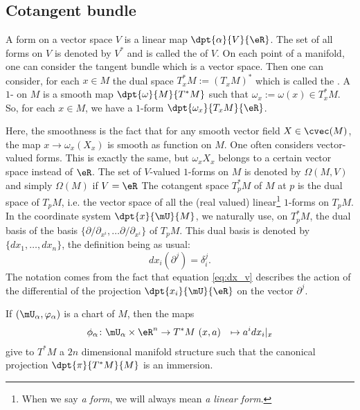 \subsection{Cotangent bundle}

A form on a vector space $V$ is a linear map $\dpt{\alpha}{V}{\eR}$. The set of all forms on $V$ is denoted by $V^*$ and is called the  of $V$. On each point of a manifold, one can consider the tangent bundle which is a vector space. Then one can consider, for each $x\in M$ the dual space $T^*_xM:=(T_xM)^*$ which is called the . A $1$- on $M$ is a smooth map $\dpt{\omega}{M}{T^*M}$ such that $\omega_x:=\omega(x)\in T^*_xM$. So, for each $x\in M$, we have a $1$-form $\dpt{\omega_x}{T_xM}{\eR}$.

Here, the smoothness is the fact that for any smooth vector field $X\in\cvec(M)$, the map $x\to\omega_x(X_x)$ is smooth as function on $M$. One often considers vector-valued forms. This is exactly the same, but $\omega_xX_x$ belongs to a certain vector space instead of $\eR$. The set of $V$-valued $1$-forms on $M$ is denoted by $\Omega(M,V)$  and simply $\Omega(M)$ if $V=\eR$
The cotangent space $T^*_pM$ of $M$ at $p$ is the dual space of $T_pM$, i.e. the vector space of all the (real valued) linear\footnote{When we say \emph{a form}, we will always mean \emph{a linear form}.} $1$-forms on $T_pM$. In the coordinate system $\dpt{x}{\mU}{M}$, we naturally use, on $T^*_pM$, the dual basis of the basis $\{\partial/\partial_{x^i},\ldots\partial/\partial_{x^i}\}$ of $T_pM$. This dual basis is denoted by $\{dx_1,\ldots,dx_n\}$, the definition being as usual:
\begin{equation}\label{eq:dx_v}
	dx_i(\partial^j)=\delta^j_i.
\end{equation}
The notation comes from the fact that equation \eqref{eq:dx_v} describes the action of the differential of the projection $\dpt{x_i}{\mU}{\eR}$ on the vector $\partial^j$.

If $(\mU_{\alpha},\varphi_{\alpha})$ is a chart of $M$, then the maps
\begin{equation}
	\begin{aligned}
		\phi_{\alpha} \colon \mU_{\alpha}\times\eR^n & \to T^*M\
		(x,a)                                        & \mapsto a^idx_i|_x
	\end{aligned}
\end{equation}
give to $T^*M$ a $2n$ dimensional manifold structure such that the canonical projection $\dpt{\pi}{T^*M}{M}$ is an immersion.

